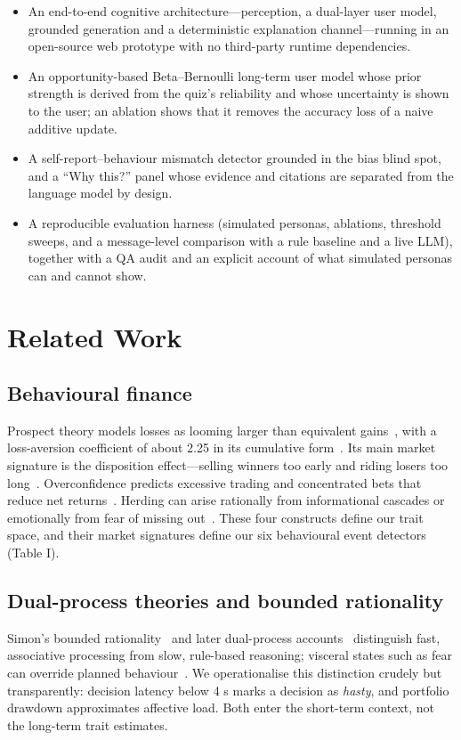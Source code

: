 \documentclass[conference]{IEEEtran}
\begin{document}
\begin{itemize}
\item An end-to-end cognitive architecture---perception, a dual-layer user model, grounded generation and a deterministic explanation channel---running in an open-source web prototype with no third-party runtime dependencies.
\item An opportunity-based Beta--Bernoulli long-term user model whose prior strength is derived from the quiz's reliability and whose uncertainty is shown to the user; an ablation shows that it removes the accuracy loss of a naive additive update.
\item A self-report--behaviour mismatch detector grounded in the bias blind spot, and a ``Why this?'' panel whose evidence and citations are separated from the language model by design.
\item A reproducible evaluation harness (simulated personas, ablations, threshold sweeps, and a message-level comparison with a rule baseline and a live LLM), together with a QA audit and an explicit account of what simulated personas can and cannot show.
\end{itemize}
\section{Related Work}
\subsection{Behavioural finance}
Prospect theory models losses as looming larger than equivalent gains~\cite{kt79}, with a loss-aversion coefficient of about 2.25 in its cumulative form~\cite{tk92}. Its main market signature is the disposition effect---selling winners too early and riding losers too long~\cite{ss85,odean98}. Overconfidence predicts excessive trading and concentrated bets that reduce net returns~\cite{bo00,bo01}. Herding can arise rationally from informational cascades or emotionally from fear of missing out~\cite{banerjee92,bhw92}. These four constructs define our trait space, and their market signatures define our six behavioural event detectors (Table I).

\subsection{Dual-process theories and bounded rationality}
Simon's bounded rationality~\cite{simon55} and later dual-process accounts~\cite{kahneman11,es13} distinguish fast, associative processing from slow, rule-based reasoning; visceral states such as fear can override planned behaviour~\cite{loewenstein96}. We operationalise this distinction crudely but transparently: decision latency below 4 s marks a decision as \textit{hasty}, and portfolio drawdown approximates affective load. Both enter the short-term context, not the long-term trait estimates.
\end{document}
